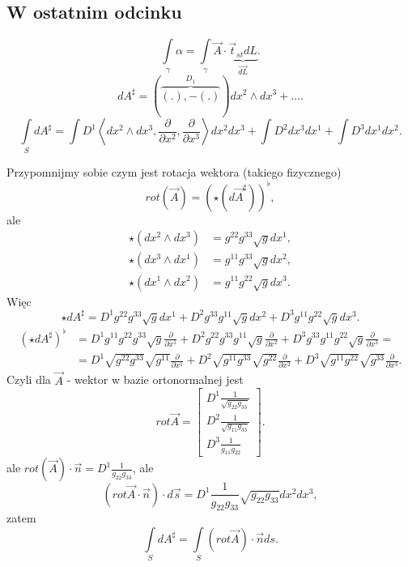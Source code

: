 \documentclass[../main.tex]{subfiles}
\begin{document}
    \subsection{W ostatnim odcinku}
    \[
        \int\limits_\gamma \alpha = \int\limits_\gamma \vec{A}\cdot \underbrace{\vec{t}_{st}dL}_{\vec{dL}}
    .\]
\[
    dA^\sharp = \left( \overbrace{\left( . \right) , - \left( . \right)}^{D_1}  \right)dx^2\land dx^3 + \ldots
.\]
\[
    \int\limits_S dA^\sharp = \int\limits D^1\left<dx^2\land dx^3, \frac{\partial }{\partial x^2} , \frac{\partial }{\partial x^3}  \right>dx^2dx^3 + \int\limits D^2 dx^{3} dx^{1} + \int\limits D^3 dx^{1} dx^{2}
.\]

Przypomnijmy sobie czym jest rotacja wektora (takiego fizycznego)
\[
    rot(\vec{A}) = \left( \star\left( d\vec{A}^\sharp \right)  \right) ^\flat
,\]
ale
\begin{align*}
    \star(dx^{2} \land dx^{3} ) &= g^{22}g^{33}\sqrt{g}dx^{1},\\
    \star(dx^{3} \land dx^{1} ) &= g^{11}g^{33}\sqrt{g} dx^{2} ,\\
    \star(dx^{1} \land dx^{2} ) &= g^{11}g^{22}\sqrt{g} dx^{3}
.\end{align*}
Więc
\[
    \star dA^\sharp = D^1 g^{22}g^{33}\sqrt{g} dx^{1} + D^2 g^{33}g^{11}\sqrt{g} dx^{2} + D^3 g^{11}g^{22}\sqrt{g} dx^{3}
.\]
\begin{align*}
    \left( \star dA^\sharp \right) ^\flat &= D^1 g^{11}g^{22}g^{33}\sqrt{g} \frac{\partial }{\partial x^1} + D^2 g^{22}g^{33}g^{11}\sqrt{g} \frac{\partial }{\partial x^2} + D^3 g^{33}g^{11}g^{22}\sqrt{g} \frac{\partial }{\partial x^3}  =\\
    &= D^1 \sqrt{g^{22}g^{33}} \sqrt{g^{11}} \frac{\partial }{\partial x^1} + D^2 \sqrt{g^{11}g^{33}} \sqrt{g^{22}} \frac{\partial }{\partial x^2} + D^3 \sqrt{g^{11}g^{22}} \sqrt{g^{33}} \frac{\partial }{\partial x^3}
.\end{align*}
Czyli dla $\vec{A}$ - wektor w bazie ortonormalnej jest
\[
    rot \vec{A} = \begin{bmatrix} D^1 \frac{1}{\sqrt{g_{22}g_{33}} }\\ D^2 \frac{1}{\sqrt{g_{11}g_{33}}}\\ D^3 \frac{1}{g_{11}g_{22}} \end{bmatrix}
.\]
ale $rot(\vec{A})\cdot \vec{n} = D^1 \frac{1}{g_{22}g_{33}}$, ale
\[
    \left( rot \vec{A}\cdot \vec{n} \right) \cdot d\vec{s} = D^1 \frac{1}{g_{22}g_{33}}\sqrt{g_{22}g_{33}}dx^{2} dx^{3}
,\]
zatem
\[
    \int\limits_S dA^\sharp = \int\limits_S (rot \vec{A}) \cdot \vec{n}  ds
.\]
\end{document}
